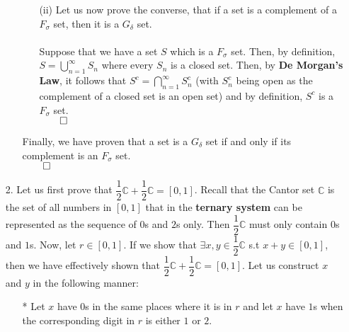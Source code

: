 \documentclass[11pt]{article}
\begin{document}
\begin{itemize}
\begin{itemize}
\begin{itemize}
                    \item[(ii)]
                        Let us now prove the converse, that if a set is a
                        complement of a $F_\sigma$ set, then it is a $G_\delta$
                        set.
                        \\
                        \\
                        Suppose that we have a set $S$ which is a $F_\sigma$
                        set. Then, by definition, $S = \displaystyle\bigcup_{n
                        = 1}^{\infty}S_n$ where every $S_n$ is a closed set.
                        Then, by \textbf{De Morgan's Law}, it follows that $S^c
                        = \displaystyle\bigcap_{n = 1}^{\infty}S_n^c$ (with
                        $S_n^c$ being open as the complement of a closed set is
                        an open set) and by definition, $S^c$ is a $F_\sigma$
                        set.\\
                        $\qed$
                \end{itemize}
                Finally, we have proven that a set is a $G_\delta$ set if and
                only if its complement is an $F_\sigma$ set.\\
                $\qed$
        \end{itemize}

    \item[2.]
        Let us first prove that
        $\dfrac{1}{2}\mathbb{C} + \dfrac{1}{2}\mathbb{C} = [0, 1]$.
        Recall that the Cantor set $\mathbb{C}$ is the set of all numbers in
        $[0, 1]$ that in the \textbf{ternary system} can be represented as the
        sequence of $0$s and $2$s only. Then $\dfrac{1}{2}\mathbb{C}$ must only
        contain $0$s and $1$s. Now, let $r \in [0, 1]$. If we show that $\exists
        x, y \in \dfrac{1}{2}\mathbb{C}$ s.t $x + y \in [0, 1]$, then we have
        effectively shown that
        $\dfrac{1}{2}\mathbb{C} + \dfrac{1}{2}\mathbb{C} = [0, 1]$. Let us
        construct $x$ and $y$ in the following manner:
        \begin{itemize}
            \item[*]
                Let $x$ have $0$s in the same places where it is in $r$ and let
                $x$ have $1$s when the corresponding digit in $r$ is either $1$
                or $2$.


\end{itemize}
\end{itemize}
\end{document}
